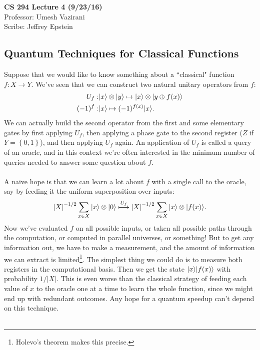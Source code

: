 \documentclass[]{article}
\newcommand{\modulus}[1]{\left\vert#1\right\vert}
\newcommand{\set}[1]{\left\lbrace#1\right\rbrace}
\theoremstyle{plain}
\theoremstyle{definition}
\theoremstyle{remark}
\begin{document}
\noindent\textbf{CS 294 Lecture 4 (9/23/16)}\\
Professor: Umesh Vazirani\\
Scribe: Jeffrey Epstein
\subsection*{Quantum Techniques for Classical Functions}
Suppose that we would like to know something about a ``classical" function $f:X\rightarrow Y$. We've seen that we can construct two natural unitary operators from $f$:
\begin{equation}
\begin{aligned}
U_f:&{\left\vert{x}\right\rangle}\otimes{\left\vert{y}\right\rangle}\mapsto{\left\vert{x}\right\rangle}\otimes{\left\vert{y\oplus f(x)}\right\rangle}\\
(-1)^f:&{\left\vert{x}\right\rangle}\mapsto(-1)^{f(x)}{\left\vert{x}\right\rangle}.
\end{aligned}
\end{equation}
We can actually build the second operator from the first and some elementary gates by first applying $U_f$, then applying a phase gate to the second register ($Z$ if $Y=\set{0,1}$), and then applying $U_f$ again. An application of $U_f$ is called a query of an oracle, and in this context we're often interested in the minimum number of queries needed to answer some question about $f$.\\
\\
A naive hope is that we can learn a lot about $f$ with a single call to the oracle, say by feeding it the uniform superposition over inputs:
\begin{equation}
\modulus{X}^{-1/2}\sum_{x\in X}\ket{x}\otimes\ket{0}\overset{U_f}{\longmapsto}\modulus{X}^{-1/2}\sum_{x\in X}\ket{x}\otimes\ket{f(x)}.
\end{equation}
Now we've evaluated $f$ on all possible inputs, or taken all possible paths through the computation, or computed in parallel universes, or something! But to get any information out, we have to make a measurement, and the amount of information we can extract is limited\footnote{Holevo's theorem makes this precise.}. The simplest thing we could do is to measure both registers in the computational basis. Then we get the state ${\left\vert{x}\right\rangle}{\left\vert{f(x)}\right\rangle}$ with probability $1/\modulus{X}$. This is even worse than the classical strategy of feeding each value of $x$ to the oracle one at a time to learn the whole function, since we might end up with redundant outcomes. Any hope for a quantum speedup can't depend on this technique.\\
\\
\end{document}

